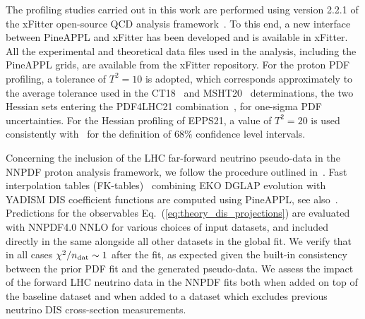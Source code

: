 The profiling studies carried out in this work are performed using version 2.2.1
of the 
{\sc\small xFitter} open-source QCD analysis framework~\cite{Alekhin:2014irh, Bertone:2017tig, xFitter:2022zjb, xFitter:web}.
%
To this end, a new interface between  {\sc\small PineAPPL} and {\sc\small xFitter} has been developed and is available in {\sc\small xFitter}.
%
All the experimental and theoretical data files used in the analysis, including
the  {\sc\small PineAPPL}  grids, are available
from the {\sc\small xFitter} repository.
%
For the proton PDF profiling, a tolerance of $T^2 = 10$ is adopted,
which  corresponds approximately to the average tolerance
used in the CT18~\cite{Hou:2019efy} and MSHT20~\cite{Bailey:2020ooq} determinations,
the two Hessian sets entering the PDF4LHC21 combination~\cite{PDF4LHCWorkingGroup:2022cjn}, for
one-sigma PDF uncertainties.
%
For the Hessian profiling of EPPS21, a value of $T^2 = 20$ is used consistently with~\cite{Eskola:2021nhw}
for the definition of 68\%  confidence level intervals.

Concerning the inclusion of the LHC far-forward neutrino pseudo-data
in the NNPDF proton analysis framework, we follow the procedure
outlined in~\cite{NNPDF:2021uiq}.
%
Fast interpolation tables (FK-tables)~\cite{Ball:2010de} combining {\sc\small EKO}
DGLAP evolution with {\sc\small YADISM} DIS coefficient functions
are computed using {\sc\small PineAPPL}, see also~\cite{Barontini:2023vmr}.
%
Predictions for the observables Eq.~(\ref{eq:theory_dis_projections}) are evaluated
with NNPDF4.0 NNLO for various choices of input datasets, and included
directly in the same alongside all other datasets in the global fit.
%
We verify that in all cases $\chi^2/n_{\rm dat}\sim 1$ after the fit,
as expected given the built-in consistency between the prior PDF fit
and the generated pseudo-data.
%
We assess the impact of the forward LHC neutrino data in the NNPDF fits both when added
on top of the baseline dataset and when added to a dataset which excludes previous neutrino DIS
cross-section measurements.




